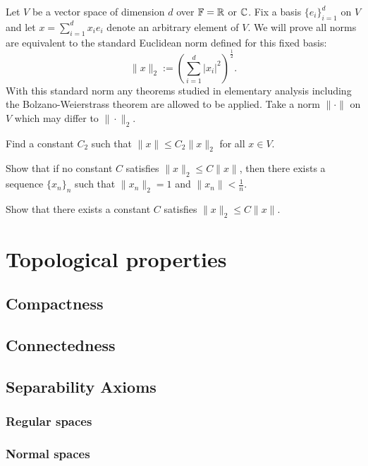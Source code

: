 \documentclass{../note}
\begin{document}
\begin{prb}
Let $V$ be a vector space of dimension $d$ over $\mathbb{F}=\mathbb{R}$ or $\mathbb{C}$.
Fix a basis $\{e_i\}_{i=1}^d$ on $V$ and let $x=\sum_{i=1}^dx_ie_i$ denote an arbitrary element of $V$.
We will prove all norms are equivalent to the standard Euclidean norm defined for this fixed basis:
\[\|x\|_2:=(\sum_{i=1}^d|x_i|^2)^{\frac12}.\]
With this standard norm any theorems studied in elementary analysis including the Bolzano-Weierstrass theorem are allowed to be applied.
Take a norm $\|\cdot\|$ on $V$ which may differ to $\|\cdot\|_2$.
\begin{parts}
\item Find a constant $C_2$ such that $\|x\|\le C_2\|x\|_2$ for all $x\in V$.
\item Show that if no constant $C$ satisfies $\|x\|_2\le C\|x\|$, then there exists a sequence $\{x_n\}_n$ such that $\|x_n\|_2=1$ and $\|x_n\|<\tfrac1n$.
\item Show that there exists a constant $C$ satisfies $\|x\|_2\le C\|x\|$.
\end{parts}
\end{prb}



\part{Topological properties}
\chapter{Compactness}
\chapter{Connectedness}
\chapter{Separability Axioms}
\section{Regular spaces}
\section{Normal spaces}
\end{document}
